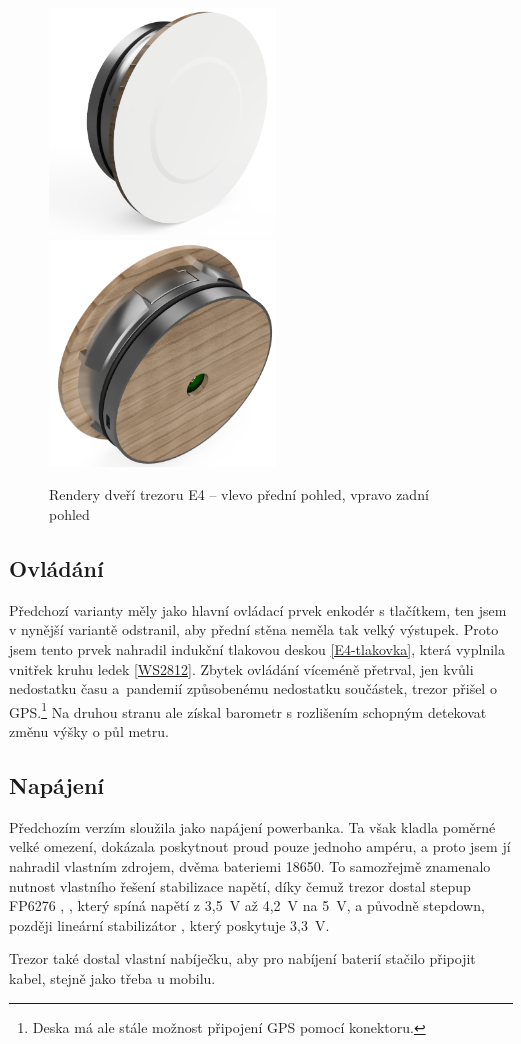 \begin{figure}[htbp]
    \centering
    \includegraphics[width=170pt]{kapitoly/obrazky/E4/predni_render.png}
    \includegraphics[width=170pt]{kapitoly/obrazky/E4/zadni_render.png}
    \caption{Rendery dveří trezoru E4 -- vlevo přední pohled, vpravo zadní pohled \centering}
    \label{fig:E4-render}
\end{figure}

\subsection*{Ovládání}
Předchozí varianty měly jako hlavní ovládací prvek enkodér s tlačítkem, ten jsem v nynější variantě odstranil, aby přední stěna neměla tak velký 
výstupek. Proto jsem tento prvek nahradil indukční tlakovou deskou \ref{E4-tlakovka}, která vyplnila vnitřek kruhu ledek \ref{WS2812}. 
Zbytek ovládání víceméně přetrval, jen kvůli nedostatku času a~pandemií způsobenému nedostatku součástek, trezor přišel o GPS.\footnote{Deska má ale stále možnost připojení GPS pomocí konektoru.}
Na druhou stranu ale získal barometr s rozlišením schopným detekovat změnu výšky o půl metru.

\subsection*{Napájení}
Předchozím verzím sloužila jako napájení powerbanka. Ta však kladla poměrné velké omezení, dokázala poskytnout proud pouze jednoho ampéru, a proto 
jsem jí nahradil vlastním zdrojem, dvěma bateriemi 18650. 
To samozřejmě znamenalo nutnost vlastního řešení stabilizace napětí, díky čemuž trezor dostal stepup FP6276 \parencite{fp6276a}, , 
který spíná napětí z 3,5~V až 4,2~V na 5~V, a původně stepdown, později lineární stabilizátor , který poskytuje 3,3~V. 

Trezor také dostal vlastní nabíječku, aby pro nabíjení baterií stačilo připojit kabel, stejně jako třeba u mobilu.
